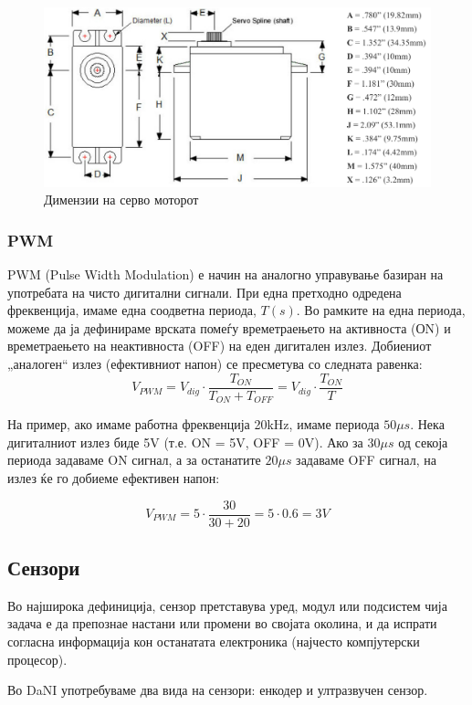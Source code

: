 \documentclass[12pt]{article}
\begin{document}
		  \begin{figure}[H]
        \includegraphics[width=0.75\linewidth]{./images/servo_schematic.png}
        \centering
        \caption{Димензии на серво моторот}
        \label{fig:servo_schematic.png}
        \end{figure}

    \subsubsection{PWM}
    	PWM (Pulse Width Modulation) е начин на аналогно управување базиран на употребата на чисто дигитални сигнали. При една претходно одредена фреквенција, имаме една соодветна периода, $T(s)$. Во рамките на една периода, можеме да ја дефинираме врската помеѓу времетраењето на активноста (ОN) и времетраењето на неактивноста (OFF) на еден дигитален излез. Добиениот „аналоген“ излез (ефективниот напон) се пресметува со следната равенка:\\

      $$ V_{PWM} = V_{dig} \cdot \frac{T_{ON}}{T_{ON} + T_{OFF}} = V_{dig} \cdot \frac{T_{ON}}{T} $$

      На пример, ако имаме работна фреквенција 20kHz, имаме периода $50\mu s$. Нека дигиталниот излез биде 5V (т.е. ON = 5V, OFF = 0V). Ако за $30\mu s$ од секоја периода задаваме ON сигнал, а за останатите $20\mu s$ задаваме OFF сигнал, на излез ќе го добиеме ефективен напон:

      $$ V_{PWM} = 5 \cdot \frac{30}{30+20} = 5 \cdot 0.6 = 3V $$

  \subsection{Сензори}
    Во најширока дефиниција, сензор претставува уред, модул или подсистем чија задача е да препознае настани или промени во својата околина, и да испрати согласна информација кон останатата електроника (најчесто компјутерски процесор).

    Во DaNI употребуваме два вида на сензори: енкодер и ултразвучен сензор.
\end{document}
